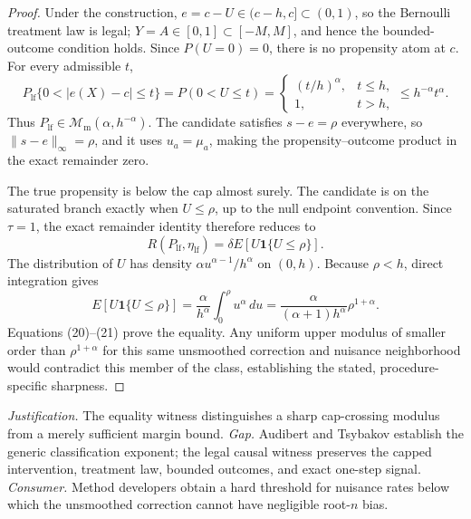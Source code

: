 \documentclass{article}
\begin{document}
\begin{proof}
Under the construction, \(e=c-U\in(c-h,c]\subset(0,1)\), so the Bernoulli treatment law is legal; \(Y=A\in[0,1]\subset[-M,M]\), and hence the bounded-outcome condition holds.  Since \(P(U=0)=0\), there is no propensity atom at \(c\).  For every admissible \(t\),
\begin{equation}
 P_{\mathrm{lf}}\{0<|e(X)-c|\le t\}
 =P(0<U\le t)
 =\begin{cases}(t/h)^\alpha,&t\le h,\\1,&t>h,
 \end{cases}
 \le h^{-\alpha}t^\alpha.                                                               \tag{19}
\end{equation}
Thus \(P_{\mathrm{lf}}\in\mathcal M_{\mathrm m}(\alpha,h^{-\alpha})\).  The candidate satisfies \(s-e=\rho\) everywhere, so
\(\|s-e\|_\infty=\rho\), and it uses \(u_a=\mu_a\), making the propensity--outcome product in the exact remainder zero.

The true propensity is below the cap almost surely.  The candidate is on the saturated branch exactly when \(U\le\rho\), up to the null endpoint convention.  Since \(\tau=1\), the exact remainder identity therefore reduces to
\begin{equation}
 R(P_{\mathrm{lf}},\eta_{\mathrm{lf}})
 =\delta E[U\mathbf1\{U\le\rho\}].                                                     \tag{20}
\end{equation}
The distribution of \(U\) has density \(\alpha u^{\alpha-1}/h^\alpha\) on \((0,h)\).  Because \(\rho<h\), direct integration gives
\begin{equation}
 E[U\mathbf1\{U\le\rho\}]
 =\frac{\alpha}{h^\alpha}\int_0^\rho u^\alpha\,du
 =\frac{\alpha}{(\alpha+1)h^\alpha}\rho^{1+\alpha}.                                   \tag{21}
\end{equation}
Equations (20)--(21) prove the equality.  Any uniform upper modulus of smaller order than \(\rho^{1+\alpha}\) for this same unsmoothed correction and nuisance neighborhood would contradict this member of the class, establishing the stated, procedure-specific sharpness.
\end{proof}
\par\smallskip\noindent \textit{Justification.} The equality witness distinguishes a sharp cap-crossing modulus from a merely sufficient margin bound. \textit{Gap.} Audibert and Tsybakov establish the generic classification exponent; the legal causal witness preserves the capped intervention, treatment law, bounded outcomes, and exact one-step signal. \textit{Consumer.} Method developers obtain a hard threshold for nuisance rates below which the unsmoothed correction cannot have negligible root-\(n\) bias.
\end{document}
